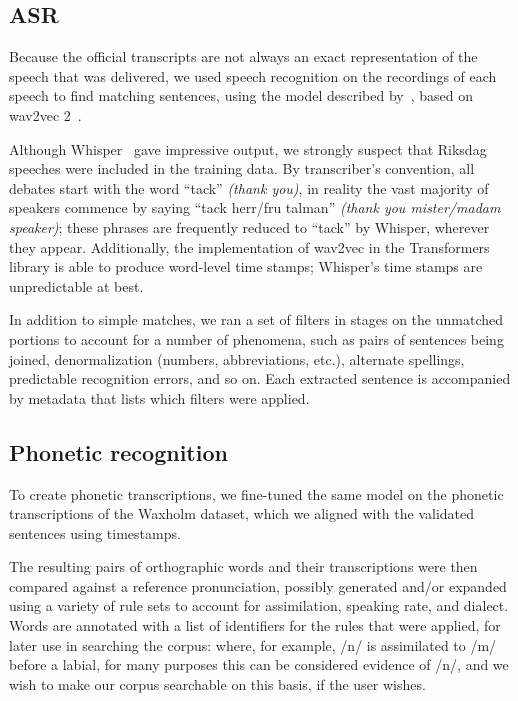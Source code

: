 \documentclass{Interspeech}
\begin{document}
\subsection{ASR}

Because the official transcripts are not always an exact representation of the speech that was delivered, we used speech recognition on the recordings of each speech to find matching sentences, using the model described by~\cite{malmstenHearingVoicesNational2022}, based on wav2vec 2~\cite{baevski2020wav2vec2}.

Although Whisper~\cite{radford23whisper} gave impressive output, we strongly suspect that Riksdag speeches were included in the training data. By transcriber's convention, all debates start with the word ``tack'' \textit{(thank you)}, in reality the vast majority of speakers commence by saying ``tack herr/fru talman'' \textit{(thank you mister/madam speaker)}; these phrases are frequently reduced to ``tack'' by Whisper, wherever they appear. Additionally, the implementation of wav2vec in the Transformers library is able to produce word-level time stamps; Whisper's time stamps are unpredictable at best.

In addition to simple matches, we ran a set of filters in stages on the unmatched portions to account for a number of phenomena, such as pairs of sentences being joined, denormalization (numbers, abbreviations, etc.), alternate spellings, predictable recognition errors, and so on. Each extracted sentence is accompanied by metadata that lists which filters were applied.

\subsection{Phonetic recognition}

To create phonetic transcriptions, we fine-tuned the same model on the phonetic transcriptions of the Waxholm dataset, which we aligned with the validated sentences using timestamps.

The resulting pairs of orthographic words and their transcriptions were then compared against a reference pronunciation, possibly generated and/or expanded using a variety of rule sets to account for assimilation, speaking rate, and dialect. Words are annotated with a list of identifiers for the rules that were applied, for later use in searching the corpus: where, for example, /n/ is assimilated to /m/ before a labial, for many purposes this can be considered evidence of /n/, and we wish to make our corpus searchable on this basis, if the user wishes.
\end{document}
